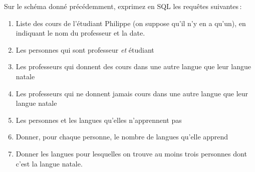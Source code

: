 Sur le schéma donné précédemment, exprimez en SQL les requêtes suivantes\,:

\begin{enumerate}
  \item Liste des cours de l'étudiant Philippe (on suppose qu'il n'y en a qu'un), 
    en indiquant le nom
     du professeur et la date.
   \item Les personnes qui sont professeur \emph{et} étudiant
   \item Les professeurs qui donnent des cours dans une autre langue
       que leur langue natale
   \item Les professeurs qui ne donnent jamais cours dans une autre langue
       que leur langue natale
   \item Les personnes et les langues qu'elles n'apprennent pas
   \item Donner, pour chaque personne, le nombre de langues qu'elle apprend
   \item Donner les langues pour lesquelles on trouve au moins
       trois personnes dont c'est la langue natale. 
\end{enumerate}


